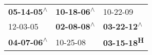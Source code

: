 \begin{supertabular}{lll}
 \textbf{05-14-05\textsuperscript{$\wedge$}} &  \textbf{10-18-06\textsuperscript{$\wedge$}} &                   10-22-09\textsuperscript{} \\
                  12-03-05\textsuperscript{} &  \textbf{02-08-08\textsuperscript{$\wedge$}} &  \textbf{03-22-12\textsuperscript{$\wedge$}} \\
 \textbf{04-07-06\textsuperscript{$\wedge$}} &                   10-25-08\textsuperscript{} &         \textbf{03-15-18\textsuperscript{H}} \\
\end{supertabular}
